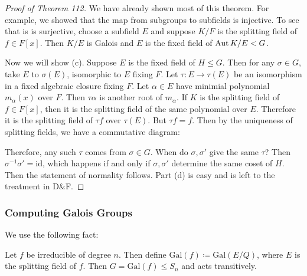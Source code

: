 \message{ !name(notes.tex)}\documentclass[10pt, twoside]{article}
\newcommand{\Gal}[1]{\mathrm{Gal}(#1)}
\begin{document}
    \begin{proof}[Proof of Theorem 112]
        We have already shown most of this theorem. For example, we showed that the map from subgroups to subfields is injective. To see that is is surjective, choose a subfield $E$ and suppose $K/F$ is the splitting field of $f \in F[x]$. Then $K/E$ is Galois and $E$ is the fixed field of $\operatorname{Aut}{K/E} < G$.

        Now we will show (c). Suppose $E$ is the fixed field of $H \leq G$. Then for any $\sigma \in G$, take $E$ to $\sigma(E)$, isomorphic to $E$ fixing $F$. Let $\tau: E \to \tau(E)$ be an isomorphism in a fixed algebraic closure fixing $F$. Let $\alpha \in E$ have minimial polynomial $m_{\alpha}(x)$ over $F$. Then $\tau \alpha$ is another root of $m_{\alpha}$. If $K$ is the splitting field of $f \in F[x]$, then it is the splitting field of the same polynomial over $E$. Therefore it is the splitting field of $\tau f$ over $\tau(E)$. But $\tau f = f$. Then by the uniqueness of splitting fields, we have a commutative diagram: 
        \begin{center}
        \end{center}
        Therefore, any such $\tau$ comes from $\sigma \in G$. When do $\sigma, \sigma'$ give the same $\tau$? Then $\sigma^{-1}\sigma' = \mathrm{id}$, which happens if and only if $\sigma, \sigma'$ determine the same coset of $H$. Then the statement of normality follows. Part (d) is easy and is left to the treatment in D\&F.
    \end{proof}

        \subsubsection{Computing Galois Groups}%
        We use the following fact:
        \begin{prop}
            Let $f$ be irreducible of degree $n$. Then define $\Gal{f} \coloneqq \Gal{E/Q}$, where $E$ is the splitting field of $f$. Then $G = \Gal{f} \leq S_n$ and acts transitively.
        \end{prop}
\end{document}
